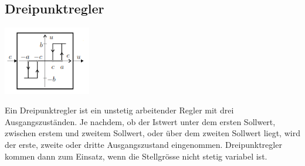\subsection{Dreipunktregler }		
\begin{minipage}{5cm}
 		\includegraphics[height=3cm]{./bilder/Dreipunktregler1.png}
\end{minipage}
		\begin{minipage}{14cm}
        Ein Dreipunktregler ist ein unstetig arbeitender Regler mit drei Ausgangszuständen. Je nachdem, ob der Istwert unter dem ersten Sollwert, zwischen erstem und zweitem Sollwert, oder über dem zweiten Sollwert liegt, wird der erste, zweite oder dritte Ausgangszustand eingenommen. Dreipunktregler kommen dann zum Einsatz, wenn die Stellgrösse nicht stetig variabel ist. 
        \end{minipage}
       
		